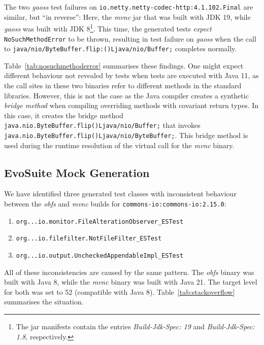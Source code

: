 \documentclass[conference]{IEEEtran}
\newcommand{\tim}[1]{\textbf{\textcolor{violet}{[ \ding{46}Tim: #1]}}}
\begin{document}
The two \textit{gaoss} test failures on \texttt{io.netty.netty-\-codec-http:4.1.102.Final} are similar, but ``in reverse'': Here, the \textit{mvnc} jar that was built with JDK 19, while \textit{gaoss} was built with JDK 8\footnote{The jar manifests contain the entries \textit{Build-Jdk-Spec: 19} and \textit{Build-Jdk-Spec: 1.8}, respectively.}.
This time, the generated tests \textit{expect} \texttt{NoSuchMethodError} to be thrown, resulting in test failure on \textit{gaoss} when the call to \texttt{java/\-nio/\-Byte\-Buffer.flip:()Ljava/nio/Buffer;} completes normally.%

Table~\ref{tab:nosuchmethoderror} summarises these findings. One might expect different behaviour not revealed by tests when tests are executed with Java 11, as the call sites in these two binaries refer to different methods in the standard libraries. However, this is not the case as the Java compiler creates a synthetic \textit{bridge method} when compiling overriding methods with covariant return types. In this case, it creates the bridge method \texttt{java.nio.ByteBuffer.flip()Ljava/nio/Buffer;}  that invokes \texttt{java.nio.ByteBuffer.flip()Ljava/nio/ByteBuffer;}. This bridge method is used during the  runtime resolution of the virtual call for the \textit{mvnc} binary.


\subsection{EvoSuite Mock Generation}


We have identified three generated test classes with inconsistent behaviour between the \textit{obfs} and \textit{mvnc} builds for \texttt{commons-io:commons-io:2.15.0}: 
\begin{enumerate}
	\item  \texttt{org...io.monitor.FileAlterationObserver\_ESTest}
    \item \texttt{org...io.filefilter.NotFileFilter\_ESTest}
    \item  \texttt{org...io.output.UncheckedAppendableImpl\_ESTest}
\end{enumerate}

All of these inconsistencies are caused by the same pattern.  The \textit{obfs} binary was built  with Java 8, while the \textit{mvnc} binary was built with Java 21. The target level for both was set to 52 (compatible with Java 8). Table~\ref{tab:stackoverflow} summarises the situation.
\end{document}
